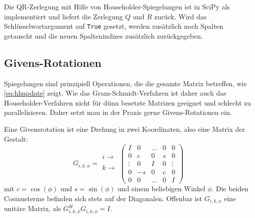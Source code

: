 Die QR-Zerlegung mit Hilfe von Householder-Spiegelungen ist in SciPy
als  implementiert und liefert die Zerlegung
$Q$ und $R$ zurück. Wird das Schlüsselwortargument  auf
\texttt{True} gesetzt, werden zusätzlich noch Spalten getauscht und
die neuen Spaltenindizes zusätzlich zurückgegeben.

\subsection{Givens-Rotationen}

Spiegelungen sind prinzipiell Operationen, die die gesamte Matrix
betreffen, wie \eqref{eq:hhupdate} zeigt. Wie das
Gram-Schmidt-Verfahren ist daher auch das Householder-Verfahren nicht
für dünn besetzte Matrizen geeignet und schlecht zu
parallelisieren. Daher setzt man in der Praxis gerne Givens-Rotationen
ein.

Eine Givensrotation ist eine Drehung in zwei Koordinaten, also eine
Matrix der Gestalt:
\begin{equation}
  G_{i,k,\phi} = \begin{matrix}
    \\
    i\rightarrow\\
    \\
    k\rightarrow\\
    \\
  \end{matrix}\begin{pmatrix}
    I      & 0 & \ldots& 0&0\\
    0      & c & 0 & s & 0 \\
    \vdots & 0 & I & 0 & \vdots\\
    0      & -s & 0 & c & 0 \\
    0      & 0 & \ldots& 0 &I
  \end{pmatrix}
\end{equation}
mit $c=\cos(\phi)$ und $s=\sin(\phi)$ und einem beliebigen Winkel
$\phi$. Die beiden Cosinusterme befinden sich stets auf der
Diagonalen. Offenbar ist $G_{i,k,\phi}$ eine unitäre Matrix, als
$G_{i,k,\phi}^HG_{i,k,\phi}=I$.

